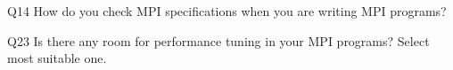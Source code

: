 \begin{description}%
\item{Q14} How do you check MPI specifications when you are writing MPI programs?%
\item{Q23} Is there any room for performance tuning in your MPI programs? Select most suitable one.%
\end{description}%
